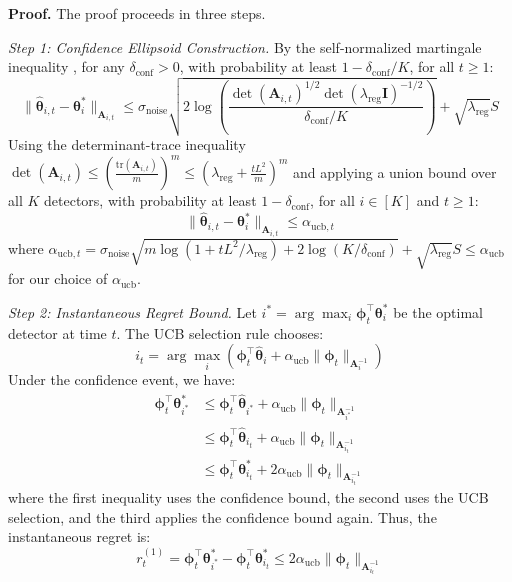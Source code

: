 \documentclass[11pt]{article}
\begin{document}
\textbf{Proof.} The proof proceeds in three steps.

\textit{Step 1: Confidence Ellipsoid Construction.}
By the self-normalized martingale inequality \cite{Abbasi2011Improved}, for any $\delta_{\text{conf}} > 0$, with probability at least $1 - \delta_{\text{conf}}/K$, for all $t \geq 1$:
\begin{equation}
\|\hat{\boldsymbol{\theta}}_{i,t} - \boldsymbol{\theta}_i^*\|_{\mathbf{A}_{i,t}} \leq \sigma_{\text{noise}}\sqrt{2\log\left(\frac{\det(\mathbf{A}_{i,t})^{1/2} \det(\lambda_{\text{reg}}\mathbf{I})^{-1/2}}{\delta_{\text{conf}}/K}\right)} + \sqrt{\lambda_{\text{reg}}}S
\end{equation}
Using the determinant-trace inequality $\det(\mathbf{A}_{i,t}) \leq \left(\frac{\text{tr}(\mathbf{A}_{i,t})}{m}\right)^m \leq \left(\lambda_{\text{reg}} + \frac{tL^2}{m}\right)^m$ and applying a union bound over all $K$ detectors, with probability at least $1 - \delta_{\text{conf}}$, for all $i \in [K]$ and $t \geq 1$:
\begin{equation}
\|\hat{\boldsymbol{\theta}}_{i,t} - \boldsymbol{\theta}_i^*\|_{\mathbf{A}_{i,t}} \leq \alpha_{\text{ucb},t}
\end{equation}
where $\alpha_{\text{ucb},t} = \sigma_{\text{noise}}\sqrt{m\log(1 + tL^2/\lambda_{\text{reg}}) + 2\log(K/\delta_{\text{conf}})} + \sqrt{\lambda_{\text{reg}}}S \leq \alpha_{\text{ucb}}$ for our choice of $\alpha_{\text{ucb}}$.

\textit{Step 2: Instantaneous Regret Bound.}
Let $i^* = \arg\max_i \boldsymbol{\phi}_t^\top \boldsymbol{\theta}_i^*$ be the optimal detector at time $t$. The UCB selection rule chooses:
\begin{equation}
i_t = \arg\max_i \left( \boldsymbol{\phi}_t^\top \hat{\boldsymbol{\theta}}_i + \alpha_{\text{ucb}} \|\boldsymbol{\phi}_t\|_{\mathbf{A}_i^{-1}} \right)
\end{equation}
Under the confidence event, we have:
\begin{align}
\boldsymbol{\phi}_t^\top \boldsymbol{\theta}_{i^*}^* &\leq \boldsymbol{\phi}_t^\top \hat{\boldsymbol{\theta}}_{i^*} + \alpha_{\text{ucb}} \|\boldsymbol{\phi}_t\|_{\mathbf{A}_{i^*}^{-1}} \\
&\leq \boldsymbol{\phi}_t^\top \hat{\boldsymbol{\theta}}_{i_t} + \alpha_{\text{ucb}} \|\boldsymbol{\phi}_t\|_{\mathbf{A}_{i_t}^{-1}} \\
&\leq \boldsymbol{\phi}_t^\top \boldsymbol{\theta}_{i_t}^* + 2\alpha_{\text{ucb}} \|\boldsymbol{\phi}_t\|_{\mathbf{A}_{i_t}^{-1}}
\end{align}
where the first inequality uses the confidence bound, the second uses the UCB selection, and the third applies the confidence bound again. Thus, the instantaneous regret is:
\begin{equation}
r_t^{(1)} = \boldsymbol{\phi}_t^\top \boldsymbol{\theta}_{i^*}^* - \boldsymbol{\phi}_t^\top \boldsymbol{\theta}_{i_t}^* \leq 2\alpha_{\text{ucb}} \|\boldsymbol{\phi}_t\|_{\mathbf{A}_{i_t}^{-1}}
\end{equation}
\end{document}
